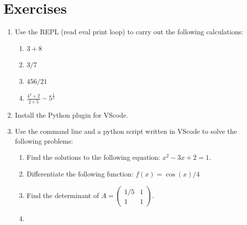 \section{Exercises}
\label{\detokenize{building-tools/04-editor-and-cli/exercises/main:exercises}}\label{\detokenize{building-tools/04-editor-and-cli/exercises/main::doc}}

\begin{enumerate}
\item 

Use the REPL (read eval print loop) to carry out the following calculations:
\begin{enumerate}

\item 

\(3 + 8\)

\item 

\(3 / 7\)

\item 

\(456 / 21\)

\item 

\(\frac{4 ^ 3 + 2}{2\times 5} - 5 ^ {\frac{1}{2}}\)

\end{enumerate}

\item 

Install the Python plugin for VScode.

\item 

Use the command line and a python script written in VScode to solve the
following problems:
\begin{enumerate}

\item 

Find the solutions to the following equation: \(x ^ 2 - 3 x + 2 = 1\).

\item 

Differentiate the following function: \(f(x) = \cos(x) / 4\)

\item 

Find the determinant of \(A = \begin{pmatrix} 1 / 5 & 1\\1 & 1\end{pmatrix}\).

\item 


\end{enumerate}
\end{enumerate}
